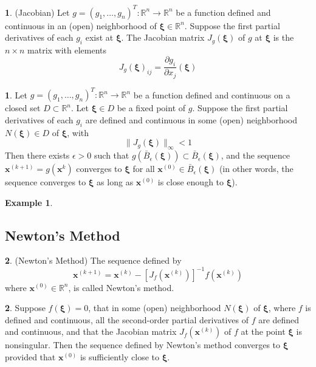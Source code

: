 \documentclass[12pt]{article}
\theoremstyle{definition}
\newtheorem{definition}{\color{NavyBlue}{\textbf{Definition}}}
\newcommand{\e}{\epsilon}
\newcommand{\R}{\mathbb{R}}
\newcommand{\norm}[1]{\lVert#1\rVert}
\newcommand{\x}{\bm{x}}
\newcommand{\xib}{\bm{\xi}}
\newtheorem{theorem}{\color{ForestGreen}{\textbf{Theorem}}}
\newtheorem{example}{\color{WildStrawberry}Example}
\theoremstyle{definition}
\begin{document}
\begin{definition}(Jacobian)
Let $g = (g_1, \ldots, g_n)^T : \R^n \to \R^n$ be a function defined and continuous in an (open) neighborhood of $\xib \in \R^n$. Suppose the first partial derivatives of each $g_i$ exist at $\xib$. The Jacobian matrix $J_g(\xib)$ of $g$ at $\xib$ is the $n \times n$ matrix with elements
\begin{equation}
	J_g(\xib)_{ij} = \frac{\partial g_i}{\partial x_j} (\xib) 
\end{equation}
\end{definition}

\begin{theorem}
Let $g = (g_1, \ldots, g_n)^T : \R^n \to \R^n$ be a function defined and continuous on a closed set $D \subset \R^n$. Let $\xib \in D$ be a fixed point of $g$. Suppose the first partial derivatives of each $g_i$ are defined and continuous in some (open) neighborhood $N(\xib) \in D$ of $\xib$, with 
\begin{equation}
	\norm{J_g(\xib)}_\infty < 1  	
\end{equation}
Then there exists $\e > 0$ such that $g (\bar B_\e(\xib)) \subset \bar B_\e(\xib)$, and the sequence $\x^{(k+1)} = g(\x^{k})$ converges to $\xib$ for all $\x^{(0)} \in \bar B_\e(\xib)$ (in other words, the sequence converges to $\xib$ as long as $\x^{(0)}$ is close enough to $\xib$).
\end{theorem}

\begin{example}

\end{example}

\subsection*{Newton's Method}
\begin{definition}(Newton's Method)
	The sequence defined by
	\begin{equation}
		\x^{(k+1)} = \x^{(k)} - [J_f(\x^{(k)})]^{-1} f(\x^{(k)})
	\end{equation}
	where $\x^{(0)} \in \R^n$, is called Newton's method. 
\end{definition}

\begin{theorem}
Suppose $f(\xib) = 0$, that in some (open) neighborhood $N(\xib)$ of $\xib$, where $f$ is defined and continuous, all the second-order partial derivatives of $f$ are defined and continuous, and that the Jacobian matrix $J_f(\x^{(k)})$ of $f$ at the point $\xib$ is nonsingular. Then the sequence defined by Newton's method converges to $\xib$ provided that $\x^{(0)}$ is sufficiently close to $\xib$. 
\end{theorem}
\end{document}
